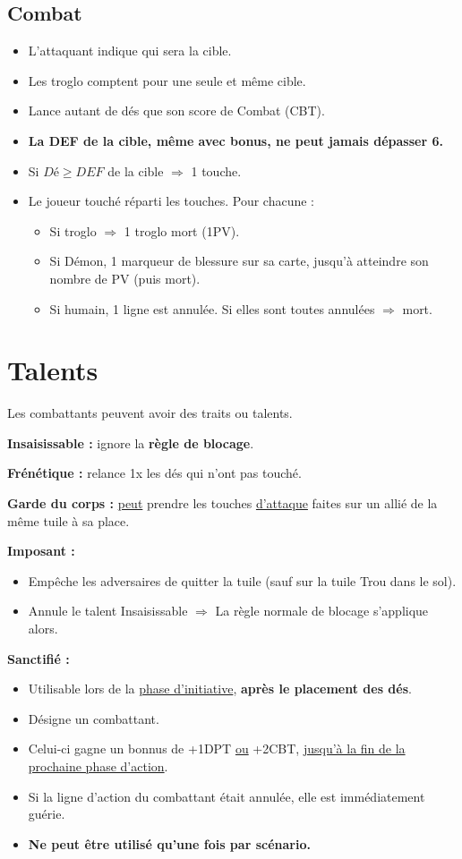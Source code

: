 \documentclass[10pt, a4paper]{article}	%
\begin{document}
\begin{multicols}{3}
\subsection{Combat}
\begin{itemize}
\item L'attaquant indique qui sera la cible.
\item Les troglo comptent pour une seule et même cible.
\item Lance autant de dés que son score de Combat (CBT).
\item \textbf{La DEF de la cible, même avec bonus, ne peut jamais dépasser 6.}
\item Si $Dé\geqslant DEF$ de la cible $\Rightarrow$ 1 touche.
\item Le joueur touché réparti les touches. Pour chacune :
\begin{itemize}
	\item Si troglo $\Rightarrow$ 1 troglo mort (1PV).
	\item Si Démon, 1 marqueur de blessure sur sa carte, jusqu'à atteindre son nombre de PV (puis mort).
	\item Si humain, 1 ligne est annulée. Si elles sont toutes annulées $\Rightarrow$ mort.
\end{itemize}
\end{itemize}



\section{Talents}
Les combattants peuvent avoir des traits ou talents.

\textbf{Insaisissable :}
ignore la \textbf{règle de blocage}.

\textbf{Frénétique :}
relance 1x les dés qui n'ont pas touché.

\textbf{Garde du corps :}
\underline{peut} prendre les touches \underline{d'attaque} faites sur un allié de la même tuile à sa place.

\textbf{Imposant :}
\begin{itemize}
\item Empêche les adversaires de quitter la tuile (sauf sur la tuile \og Trou dans le sol\fg ).
\item Annule le talent \og Insaisissable\fg{}  $\Rightarrow$ La règle normale de blocage s'applique alors.
\end{itemize}

\textbf{Sanctifié :}
\begin{itemize}
\item Utilisable lors de la \underline{phase d'initiative}, \textbf{après le placement des dés}.
\item Désigne un combattant.
\item Celui-ci gagne un bonnus de +1DPT \underline{ou} +2CBT, \underline{jusqu'à la fin de la prochaine phase d'action}.
\item Si la ligne d'action du combattant était annulée, elle est immédiatement guérie.
\item \textbf{Ne peut être utilisé qu'une fois par scénario.}
\end{itemize}



\end{multicols}
\end{document}
